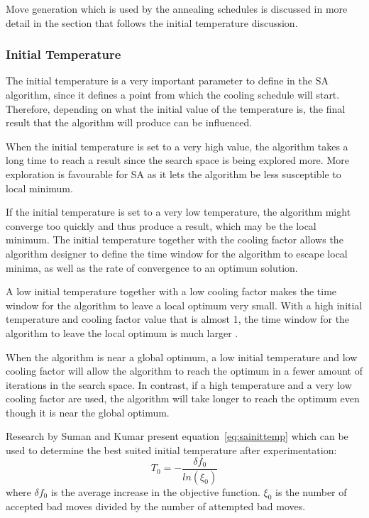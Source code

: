 Move generation which is used by the annealing schedules is discussed in more detail in the section that follows the initial temperature discussion.

\subsubsection{Initial Temperature}
The initial temperature is a very important parameter to define in the \gls{SA} algorithm, since it defines a point from which the cooling schedule will start\cite{VariousCoolingSA}. Therefore, depending on what the initial value of the temperature is, the final result that the algorithm will produce can be influenced\cite{SALongestCommon,AutoConfigSA}.

When the initial temperature is set to a very high value, the algorithm takes a long time to reach a result since the search space is being explored more\cite{SALongestCommon,VariousCoolingSA}. More exploration is favourable for \gls{SA} as it lets the algorithm be less susceptible to local minimum. 

If the initial temperature is set to a very low temperature, the algorithm might converge too quickly and thus produce a result, which may be the local minimum\cite{SALongestCommon,VariousCoolingSA,AutoConfigSA}.
The initial temperature together with the cooling factor allows the algorithm designer to define the time window for the algorithm to escape local minima, as well as the rate of convergence to an optimum solution\cite{SALongestCommon,VariousCoolingSA}.

A low initial temperature together with a low cooling factor makes the time window for the algorithm to leave a local optimum very small\cite{SALongestCommon}. With a high initial temperature and cooling factor value that is almost 1, the time window for the algorithm to leave the local optimum is much larger \cite{SALongestCommon}. 

When the algorithm is near a global optimum, a low initial temperature and low cooling factor will allow the algorithm to reach the optimum in a fewer amount of iterations in the search space\cite{SALongestCommon}. In contrast, if a high temperature and a very low cooling factor are used, the algorithm will take longer to reach the optimum even though it is near the global optimum\cite{SALongestCommon}.

Research by Suman and Kumar\cite{SASingleMultiObj} present equation~\ref{eq:sainittemp} which can be used to determine the best suited initial temperature after experimentation:
\begin{equation}
    \label{eq:sainittemp}
    T_0=-\frac{\delta f_0}{ln(\xi_0)}
\end{equation}
where $\delta f_0$ is the average increase in the objective function. $\xi_0$ is the number of accepted bad moves divided by the number of attempted bad moves\cite{SASingleMultiObj}.

